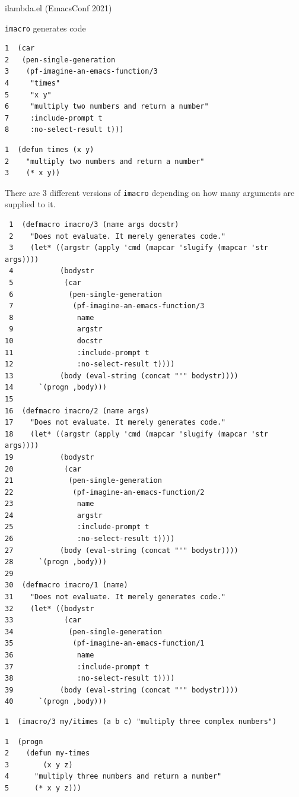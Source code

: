 \documentclass[presentation]{beamer}
\begin{document}
\begin{frame}[label={sec:org3d2ff35},fragile]{ilambda.el (EmacsConf 2021)}
\begin{block}{\texttt{imacro} generates code}
\begin{verbatim}
1  (car
2   (pen-single-generation
3    (pf-imagine-an-emacs-function/3
4     "times"
5     "x y"
6     "multiply two numbers and return a number"
7     :include-prompt t
8     :no-select-result t)))
\end{verbatim}

\begin{verbatim}
1  (defun times (x y)
2    "multiply two numbers and return a number"
3    (* x y))
\end{verbatim}

There are 3 different versions of \texttt{imacro}
depending on how many arguments are supplied to
it.

\begin{verbatim}
 1  (defmacro imacro/3 (name args docstr)
 2    "Does not evaluate. It merely generates code."
 3    (let* ((argstr (apply 'cmd (mapcar 'slugify (mapcar 'str args))))
 4           (bodystr
 5            (car
 6             (pen-single-generation
 7              (pf-imagine-an-emacs-function/3
 8               name
 9               argstr
10               docstr
11               :include-prompt t
12               :no-select-result t))))
13           (body (eval-string (concat "'" bodystr))))
14      `(progn ,body)))
15  
16  (defmacro imacro/2 (name args)
17    "Does not evaluate. It merely generates code."
18    (let* ((argstr (apply 'cmd (mapcar 'slugify (mapcar 'str args))))
19           (bodystr
20            (car
21             (pen-single-generation
22              (pf-imagine-an-emacs-function/2
23               name
24               argstr
25               :include-prompt t
26               :no-select-result t))))
27           (body (eval-string (concat "'" bodystr))))
28      `(progn ,body)))
29  
30  (defmacro imacro/1 (name)
31    "Does not evaluate. It merely generates code."
32    (let* ((bodystr
33            (car
34             (pen-single-generation
35              (pf-imagine-an-emacs-function/1
36               name
37               :include-prompt t
38               :no-select-result t))))
39           (body (eval-string (concat "'" bodystr))))
40      `(progn ,body)))
\end{verbatim}

\begin{verbatim}
1  (imacro/3 my/itimes (a b c) "multiply three complex numbers")
\end{verbatim}

\begin{verbatim}
1  (progn
2    (defun my-times
3        (x y z)
4      "multiply three numbers and return a number"
5      (* x y z)))
\end{verbatim}


\end{block}
\end{frame}
\end{document}
